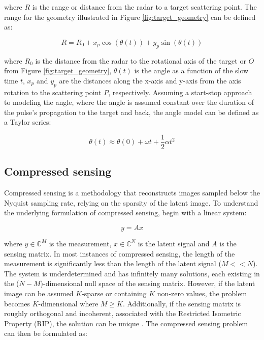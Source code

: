 \documentclass[conference]{IEEEtran}
\begin{document}
\noindent where $R$ is the range or distance from the radar to a target scattering point. The range for the geometry illustrated in Figure \ref{fig:target_geometry} can be defined as:

\begin{equation}
    R = R_{0} + x_{p} \cos(\theta(t)) + y_{p}\sin(\theta(t))
\end{equation}

\noindent where $R_{0}$ is the distance from the radar to the rotational axis of the target or $O$ from Figure \ref{fig:target_geometry}, $\theta(t)$ is the angle as a function of the slow time $t$, $x_{p}$ and $y_{p}$ are the distances along the x-axis and y-axis from the axis rotation to the scattering point $P$, respectively. Assuming a start-stop approach to modeling the angle, where the angle is assumed constant over the duration of the pulse's propagation to the target and back, the angle model can be defined as a Taylor series:

\begin{equation}
    \theta(t) \approx \theta(0) + \omega t + \frac{1}{2}\alpha t^{2}
\end{equation}


\subsection{Compressed sensing} \label{sec:cs}

Compressed sensing is a methodology that reconstructs images sampled below the Nyquist sampling rate, relying on the sparsity of the latent image. To understand the underlying formulation of compressed sensing, begin with a linear system:

\begin{equation}
    y = Ax
    \label{eq:yAx}
\end{equation}

\noindent where $y \in \mathbb{C}^{M}$ is the measurement, $x \in \mathbb{C}^{N}$ is the latent signal and $A$ is the sensing matrix. In most instances of compressed sensing, the length of the measurement is significantly less than the length of the latent signal ($M << N$). The system is underdetermined and has infinitely many solutions, each existing in the ($N-M$)-dimensional null space of the sensing matrix. However, if the latent image can be assumed $K$-sparse or containing $K$ non-zero values, the problem becomes $K$-dimensional where $M \geq K$. Additionally, if the sensing matrix is roughly orthogonal and incoherent, associated with the Restricted Isometric Property (RIP), the solution can be unique \cite{Majumdar_2018}. The compressed sensing problem can then be formulated as:
\end{document}
